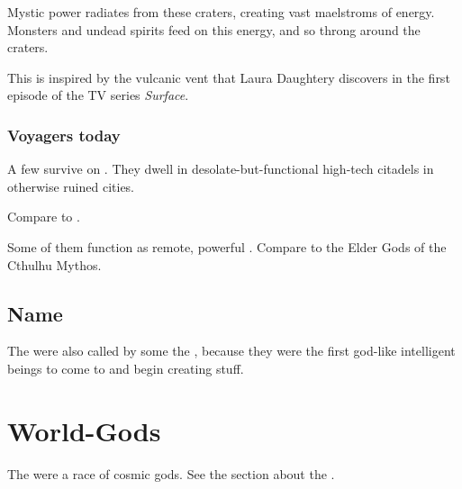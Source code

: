 Mystic power radiates from these craters, creating vast maelstroms of energy. Monsters and undead spirits feed on this energy, and so throng around the craters.

This is inspired by the vulcanic vent that Laura Daughtery discovers in the first episode of the TV series \emph{Surface}.





\subsubsection{Voyagers today}
A few \voyagers{} survive on \Miith{}. They dwell in desolate-but-functional high-tech citadels in otherwise ruined cities. 

Compare to .

Some of them function as remote, powerful . Compare to the Elder Gods of the Cthulhu Mythos. 









\subsection{Name}
The \voyagers were also called by some the , because they were the first god-like intelligent beings to come to \Miith and begin creating stuff. 















\section{World-Gods}
The  were a race of cosmic gods.
See the section about the .
















